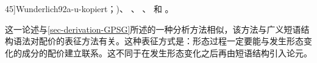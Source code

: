   45]{Wunderlich92a-u-kopiert}；\citeyear[--126]{Wunderlich97c})、 、 、 和 。

    这一论述与\ref{sec-derivation-GPSG}所述的一种分析方法相似，该方法与广义短语结构语法对配价的表征方法有关。这种表征方式是：形态过程一定要能与发生形态变化的成分的配价建立联系。这不同于在发生形态变化之后再由短语结构引入论元。

